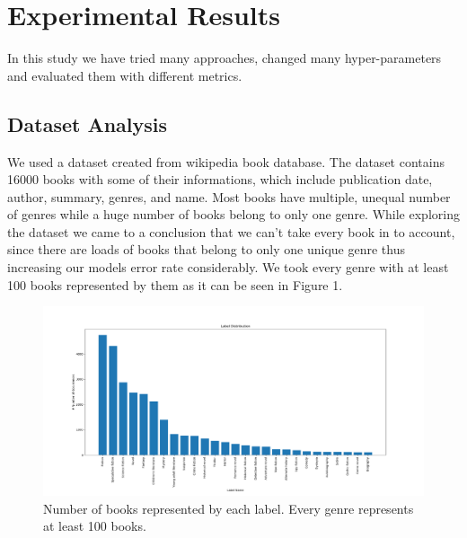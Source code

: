\documentclass[10pt,twocolumn,letterpaper]{article}
\begin{document}
\section{Experimental Results}

In this study we have tried many approaches, changed many hyper-parameters and evaluated them with different metrics. 

\subsection{Dataset Analysis}

We used a dataset created from wikipedia book database. The dataset contains 16000 books with some of their informations, which include publication date, author, summary, genres, and name. Most books have multiple, unequal number of genres while a huge number of books belong to only one genre. While exploring the dataset we came to a conclusion that we can't take every book in to account, since there are loads of books that belong to only one unique genre thus increasing our models error rate considerably. We took every genre with at least 100 books represented by them as it can be seen in Figure 1.

\begin{figure}
\begin{center}
\includegraphics[width=1\linewidth]{BookDistributionPerGenre}
\end{center}
   \caption{Number of books represented by each label. Every genre represents at least 100 books.}
\label{fig:short}
\end{figure}
\end{document}
